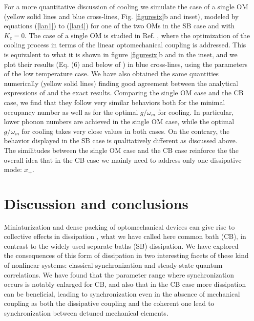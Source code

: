 \documentclass[a4paper]{jpconf}
\begin{document}
 For a more quantitative discussion of cooling we simulate the case of a single OM (yellow solid lines and blue cross-lines, Fig. \ref{figuresix}b and inset),  
modeled by equations (\ref{lan1}) to (\ref{lan4}) for one of the two OMs in the SB case and with $K_c=0$. The case of a
single OM is studied in Ref. \cite{56}, where the optimization of the cooling process in terms of the linear optomechanical coupling is addressed. This is equivalent to what it is shown in figure
\ref{figuresix}b and in the inset, and we plot their results (Eq. (6) and below of \cite{56}) in blue cross-lines, using the parameters of the low temperature case.
We have also obtained the same quantities numerically (yellow solid lines)
finding good agreement between the analytical expressions of \cite{56} and the exact results. Comparing the single OM case and the CB case, we find that they follow very similar behaviors both for the
minimal occupancy number as well as for the optimal $g/\omega_m$ for cooling. In particular, lower phonon numbers are achieved in the single OM case, while the optimal $g/\omega_m$ for cooling takes very close
values in both cases. On the contrary, the behavior displayed in the SB case is qualitatively different as discussed above. The similitudes between the 
single OM case and the CB case reinforce the the overall idea that in the CB case we mainly need to address only one dissipative mode: $x_+$. 

\section{Discussion and conclusions}

Miniaturization and dense packing of optomechanical devices can give rise to
collective effects in dissipation \cite{31}, what we have called here common bath (CB), in 
contrast to the widely used separate baths (SB) dissipation. We have explored the consequences
of this form of dissipation in two interesting facets of these kind of nonlinear systems: 
classical synchronization and steady-state quantum correlations.
We have found that the parameter range where synchronization occurs is notably enlarged for CB,
and also that in the CB case more dissipation can be beneficial, leading to synchronization
even in the absence of mechanical coupling as both the dissipative coupling and the coherent one 
lead to synchronization between detuned mechanical elements. 
\end{document}
